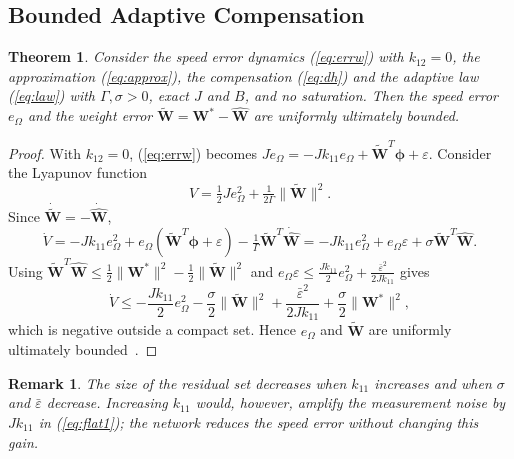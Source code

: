 \documentclass[11pt,a4paper]{article}
\newtheorem{theorem}{Theorem}
\newtheorem{remark}{Remark}
\newcommand{\bv}[1]{\mathbf{#1}}
\begin{document}
\subsection{Bounded Adaptive Compensation}
\begin{theorem}
Consider the speed error dynamics (\ref{eq:errw}) with $k_{12}=0$, the approximation (\ref{eq:approx}),
the compensation (\ref{eq:dh}) and the adaptive law (\ref{eq:law}) with $\Gamma,\sigma>0$, exact $J$ and
$B$, and no saturation. Then the speed error $e_\Omega$ and the weight error
$\tilde{\bv{W}}=\bv{W}^*-\hat{\bv{W}}$ are uniformly ultimately bounded.
\end{theorem}
\begin{proof}
With $k_{12}=0$, (\ref{eq:errw}) becomes
$J\dot e_\Omega=-Jk_{11}e_\Omega+\tilde{\bv{W}}^T\boldsymbol\phi+\varepsilon$. Consider the Lyapunov
function
\begin{equation}
V=\tfrac12Je_\Omega^2+\tfrac{1}{2\Gamma}\|\tilde{\bv{W}}\|^2 .
\end{equation}
Since $\dot{\tilde{\bv{W}}}=-\dot{\hat{\bv{W}}}$,
\begin{equation}
\dot V=-Jk_{11}e_\Omega^2+e_\Omega(\tilde{\bv{W}}^T\boldsymbol\phi+\varepsilon)
-\tfrac1\Gamma\tilde{\bv{W}}^T\dot{\hat{\bv{W}}}
=-Jk_{11}e_\Omega^2+e_\Omega\varepsilon+\sigma\tilde{\bv{W}}^T\hat{\bv{W}} .
\end{equation}
Using $\tilde{\bv{W}}^T\hat{\bv{W}}\le\frac12\|\bv{W}^*\|^2-\frac12\|\tilde{\bv{W}}\|^2$ and
$e_\Omega\varepsilon\le\frac{Jk_{11}}{2}e_\Omega^2+\frac{\bar\varepsilon^2}{2Jk_{11}}$ gives
\begin{equation}
\dot V\le-\frac{Jk_{11}}{2}e_\Omega^2-\frac\sigma2\|\tilde{\bv{W}}\|^2
+\frac{\bar\varepsilon^2}{2Jk_{11}}+\frac\sigma2\|\bv{W}^*\|^2 ,
\end{equation}
which is negative outside a compact set. Hence $e_\Omega$ and $\tilde{\bv{W}}$ are uniformly ultimately
bounded~\cite{khalil2002}.
\end{proof}

\begin{remark}
The size of the residual set decreases when $k_{11}$ increases and when $\sigma$ and $\bar\varepsilon$
decrease. Increasing $k_{11}$ would, however, amplify the measurement noise by $Jk_{11}$ in
(\ref{eq:flat1}); the network reduces the speed error without changing this gain.
\end{remark}
\end{document}

